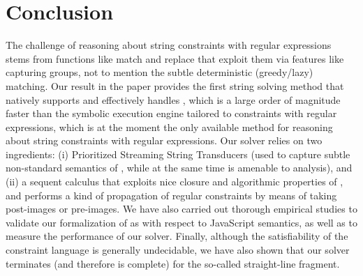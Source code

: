 
\section{Conclusion}\label{sec-related}
The challenge of reasoning about string constraints with regular expressions
stems from functions like match and replace that exploit them
via features like capturing groups, not to mention the subtle deterministic
(greedy/lazy) matching. Our result in the paper provides the first string 
solving method that natively supports and effectively handles \regexp{}, which 
is a large order of magnitude faster than the symbolic execution engine 
\expose{} \cite{LMK19} tailored to constraints with regular expressions, 
which is at the moment the only available method for reasoning about string 
constraints with regular expressions. Our solver \ostrich{} relies on two ingredients: 
(i) Prioritized Streaming String Transducers (used to capture subtle non-standard
semantics of \regexp{}, while at the same time is amenable to analysis), and
(ii) a sequent calculus that exploits nice closure and algorithmic properties of
\PSST, and performs a kind of propagation of regular constraints by means of 
taking post-images or pre-images. We have also carried out thorough empirical studies
to validate our formalization of \regexp{} as {\PSST} with respect to JavaScript
semantics, as well as to measure the performance of our solver.
Finally, although the satisfiability of the constraint language is generally 
undecidable, we have also shown that our solver terminates (and therefore is
complete) for the so-called straight-line fragment.





 

